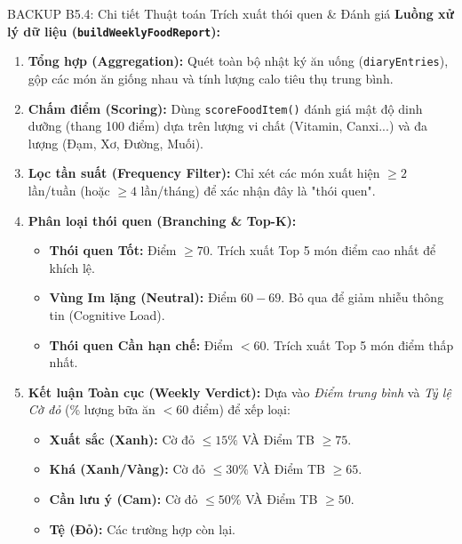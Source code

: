 \documentclass[10pt, aspectratio=169]{beamer}
\begin{document}
\begin{frame}[label=b5_4]{BACKUP B5.4: Chi tiết Thuật toán Trích xuất thói quen \& Đánh giá}
\hypertarget{b5_4_target}{}
    \textbf{Luồng xử lý dữ liệu (\texttt{buildWeeklyFoodReport}):}
    \vspace{0.1cm}
    
    \small
    \begin{enumerate}
        \item \textbf{Tổng hợp (Aggregation):} Quét toàn bộ nhật ký ăn uống (\texttt{diaryEntries}), gộp các món ăn giống nhau và tính lượng calo tiêu thụ trung bình.
        \item \textbf{Chấm điểm (Scoring):} Dùng \texttt{scoreFoodItem()} đánh giá mật độ dinh dưỡng (thang 100 điểm) dựa trên lượng vi chất (Vitamin, Canxi...) và đa lượng (Đạm, Xơ, Đường, Muối).
        \item \textbf{Lọc tần suất (Frequency Filter):} Chỉ xét các món xuất hiện $\ge 2$ lần/tuần (hoặc $\ge 4$ lần/tháng) để xác nhận đây là "thói quen".
        \item \textbf{Phân loại thói quen (Branching \& Top-K):}
        \begin{itemize}
            \item \textbf{Thói quen Tốt:} Điểm $\ge 70$. Trích xuất Top 5 món điểm cao nhất để khích lệ.
            \item \textbf{Vùng Im lặng (Neutral):} Điểm $60 - 69$. Bỏ qua để giảm nhiễu thông tin (Cognitive Load).
            \item \textbf{Thói quen Cần hạn chế:} Điểm $< 60$. Trích xuất Top 5 món điểm thấp nhất.
        \end{itemize}
        \item \textbf{Kết luận Toàn cục (Weekly Verdict):} Dựa vào \textit{Điểm trung bình} và \textit{Tỷ lệ Cờ đỏ} (\% lượng bữa ăn $< 60$ điểm) để xếp loại:
        \begin{itemize}
            \item \textbf{Xuất sắc (Xanh):} Cờ đỏ $\le 15\%$ VÀ Điểm TB $\ge 75$.
            \item \textbf{Khá (Xanh/Vàng):} Cờ đỏ $\le 30\%$ VÀ Điểm TB $\ge 65$.
            \item \textbf{Cần lưu ý (Cam):} Cờ đỏ $\le 50\%$ VÀ Điểm TB $\ge 50$.
            \item \textbf{Tệ (Đỏ):} Các trường hợp còn lại.
        \end{itemize}
    \end{enumerate}
\end{frame}
\end{document}

